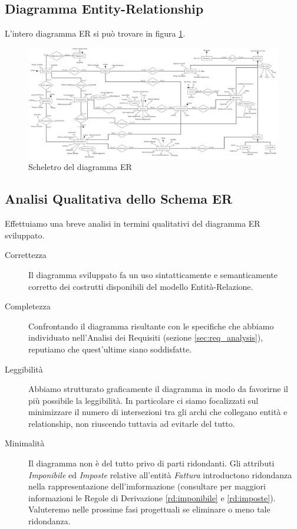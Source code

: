 	\subsection{Diagramma Entity-Relationship}
		
		L'intero diagramma ER si può trovare in figura \ref{fig:er}.
			
		\begin{figure}
			\centering
			\includegraphics[width=22cm]{images/finitures/schema.png}
			\caption{Scheletro del diagramma ER}
			\label{fig:er}
		\end{figure}

		\newpage

	\subsection{Analisi Qualitativa dello Schema ER}
		
		Effettuiamo una breve analisi in termini qualitativi del diagramma ER sviluppato.
		
		\begin{description}
			\item[Correttezza] Il diagramma sviluppato fa un uso sintatticamente e semanticamente corretto dei costrutti disponibili del modello Entità-Relazione.
			\item[Completezza] Confrontando il diagramma risultante con le specifiche che abbiamo individuato nell'Analisi dei Requisiti (sezione \ref{sec:req_analysis}), reputiamo che quest'ultime siano soddisfatte.
			\item[Leggibilità] Abbiamo strutturato graficamente il diagramma in modo da favorirne il più possibile la leggibilità. In particolare ci siamo focalizzati sul minimizzare il numero di intersezioni tra gli archi che collegano entità e relationship, non riuscendo tuttavia ad evitarle del tutto.
			\item[Minimalità] Il diagramma non è del tutto privo di parti ridondanti. Gli attributi \emph{Imponibile} ed \emph{Imposte} relative all'entità \emph{Fattura} introductono ridondanza nella rappresentazione dell'imformazione (consultare per maggiori informazioni le Regole di Derivazione \ref{rd:imponibile} e \ref{rd:imposte}). Valuteremo nelle prossime fasi progettuali se eliminare o meno tale ridondanza.
		\end{description}
		
